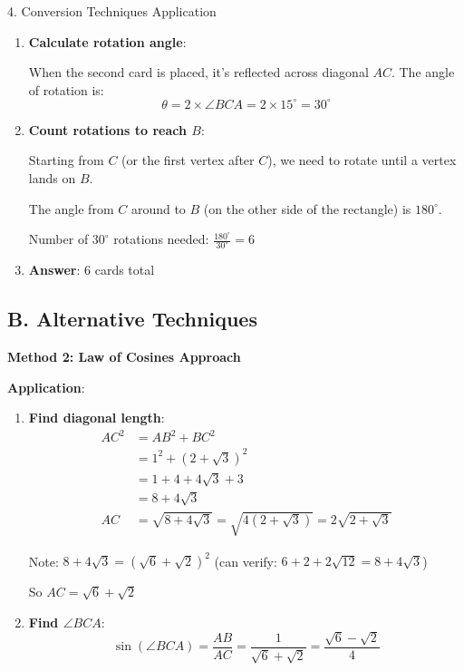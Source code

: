 \documentclass[12pt]{article}
\begin{document}
\begin{conversionbox}{4. Conversion Techniques Application}
\begin{enumerate}
    And $\tan 15^\circ = \tan(45^\circ - 30^\circ) = \frac{1 - \frac{1}{\sqrt{3}}}{1 + \frac{1}{\sqrt{3}}} = 2 - \sqrt{3}$
    
    Therefore $\angle CAD = 15^\circ$, so $\angle BCA = 15^\circ$
    
    \item \textbf{Calculate rotation angle}:
    
    When the second card is placed, it's reflected across diagonal $AC$. The angle of rotation is:
    \[\theta = 2 \times \angle BCA = 2 \times 15^\circ = 30^\circ\]
    
    \item \textbf{Count rotations to reach $B$}:
    
    Starting from $C$ (or the first vertex after $C$), we need to rotate until a vertex lands on $B$.
    
    The angle from $C$ around to $B$ (on the other side of the rectangle) is $180^\circ$.
    
    Number of $30^\circ$ rotations needed: $\frac{180^\circ}{30^\circ} = 6$
    
    \item \textbf{Answer}: 6 cards total
\end{enumerate}

\subsection*{B. Alternative Techniques}

\textbf{Method 2: Law of Cosines Approach}

\textbf{Application}:
\begin{enumerate}
    \item \textbf{Find diagonal length}:
    \begin{align*}
    AC^2 &= AB^2 + BC^2\\
    &= 1^2 + (2+\sqrt{3})^2\\
    &= 1 + 4 + 4\sqrt{3} + 3\\
    &= 8 + 4\sqrt{3}\\
    AC &= \sqrt{8 + 4\sqrt{3}} = \sqrt{4(2+\sqrt{3})} = 2\sqrt{2+\sqrt{3}}
    \end{align*}
    
    Note: $8 + 4\sqrt{3} = (\sqrt{6}+\sqrt{2})^2$ (can verify: $6 + 2 + 2\sqrt{12} = 8 + 4\sqrt{3}$)
    
    So $AC = \sqrt{6} + \sqrt{2}$
    
    \item \textbf{Find $\angle BCA$}:
    \[\sin(\angle BCA) = \frac{AB}{AC} = \frac{1}{\sqrt{6}+\sqrt{2}} = \frac{\sqrt{6}-\sqrt{2}}{4}\]
    

\end{enumerate}
\end{conversionbox}
\end{document}
